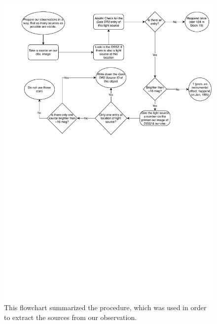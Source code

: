 \documentclass{article}
\begin{document}
\begin{figure}[H]
  \centering
    \includegraphics[trim={0 16.6cm 0 0.5cm},clip, width=1\textwidth]{flowchart.pdf}
  \caption{This flowchart summarized the procedure, which was used in order to extract the sources from our observation.}
  \label{fig:flowchart}
\end{figure}
\end{document}

